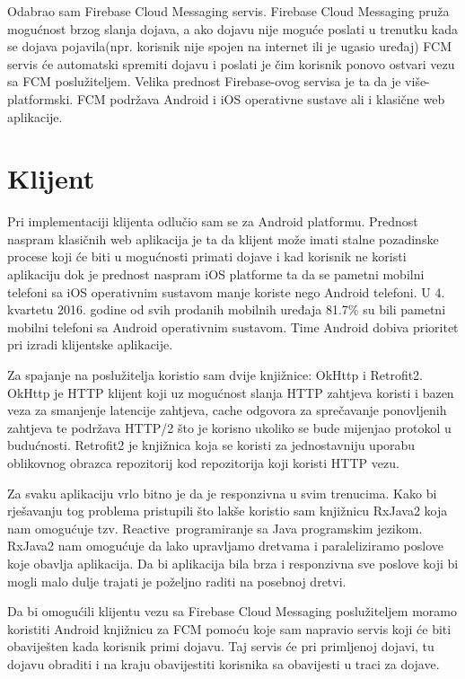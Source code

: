 \documentclass[times, utf8, zavrsni]{fer}
\begin{document}
Odabrao sam Firebase Cloud Messaging servis. Firebase Cloud Messaging pruža mogućnost brzog slanja dojava, a ako dojavu nije moguće poslati u trenutku kada se dojava pojavila(npr. korisnik nije spojen na internet ili je ugasio uređaj) FCM servis će automatski spremiti dojavu i poslati je čim korisnik ponovo ostvari vezu sa FCM poslužiteljem. Velika prednost Firebase-ovog servisa je ta da je više-platformski. FCM podržava Android i iOS operativne sustave ali i klasične web aplikacije.

\section{Klijent}

Pri implementaciji klijenta odlučio sam se za Android platformu. Prednost naspram klasičnih web aplikacija je ta da klijent može imati stalne pozadinske procese koji će biti u mogućnosti primati dojave i kad korisnik ne koristi aplikaciju dok je prednost naspram iOS platforme ta da se pametni mobilni telefoni sa iOS operativnim sustavom manje koriste nego Android telefoni. U 4. kvartetu 2016. godine od svih prodanih mobilnih uređaja 81.7\% \citep{vincent2017} su bili pametni mobilni telefoni sa Android operativnim sustavom. Time Android dobiva prioritet pri izradi klijentske aplikacije.

Za spajanje na poslužitelja koristio sam dvije knjižnice: OkHttp i Retrofit2. OkHttp je HTTP klijent koji uz mogućnost slanja HTTP zahtjeva koristi i bazen veza za smanjenje latencije zahtjeva, cache odgovora za sprečavanje ponovljenih zahtjeva te podržava HTTP/2 što je korisno ukoliko se bude mijenjao protokol u budućnosti. Retrofit2 je knjižnica koja se koristi za jednostavniju uporabu oblikovnog obrazca repozitorij kod repozitorija koji koristi HTTP vezu.

Za svaku aplikaciju vrlo bitno je da je responzivna u svim trenucima. Kako bi rješavanju tog problema pristupili što lakše koristio sam knjižnicu RxJava2 koja nam omogućuje tzv. \glqq Reactive\grqq\  programiranje sa Java programskim jezikom. RxJava2 nam omogućuje da lako upravljamo dretvama i paraleliziramo poslove koje obavlja aplikacija. Da bi aplikacija bila brza i responzivna sve poslove koji bi mogli malo dulje trajati je poželjno raditi na posebnoj dretvi.

Da bi omogućili klijentu vezu sa Firebase Cloud Messaging poslužiteljem moramo koristiti Android knjižnicu za FCM pomoću koje sam napravio servis koji će biti obaviješten kada korisnik primi dojavu. Taj servis će pri primljenoj dojavi, tu dojavu obraditi i na kraju obavijestiti korisnika sa obavijesti u traci za dojave.
\end{document}
